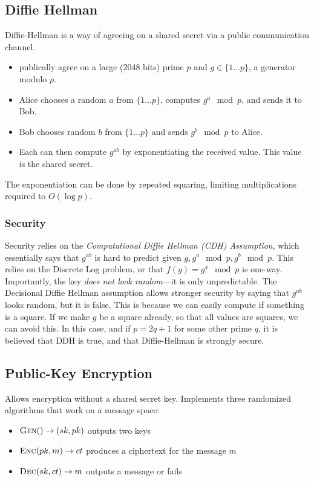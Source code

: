 \documentclass{article}
\begin{document}
\begin{multicols*}{2}
	\subsection{Diffie Hellman}
	Diffie-Hellman is a way of agreeing on a shared secret via a public communication channel.
	\begin{itemize}[noitemsep, topsep=0pt]
		\item publically agree on a large (2048 bits) prime $p$ and $g \in \{1\ldots p\}$, a generator modulo $p$.
		\item Alice chooses a random $a$ from $\{1\ldots p\}$, computes $g^a \mod p$, and sends it to Bob.
		\item Bob chooses random $b$ from $\{1\ldots p\}$ and sends $g^b \mod p$ to Alice.
		\item Each can then compute $g^{ab}$ by exponentiating the received value. This value is the shared secret.
	\end{itemize}

	The exponentiation can be done by repeated squaring, limiting multiplications required to $O(\log p)$. 

	\subsubsection{Security}
	Security relies on the \textit{Computational Diffie Hellman (CDH) Assumption}, which essentially says that $g^{ab}$ is hard to predict given $g, g^a \mod p, g^b \mod p$. This relies on the Discrete Log problem, or that $f(g) = g^x \mod p$ is one-way. Importantly, the key \textit{does not look random}---it is only unpredictable. The Decisional Diffie Hellman assumption allows stronger security by saying that $g^{ab}$ looks random, but it is false. This is because we can easily compute if something is a square. If we make $g$ be a square already, so that all values are squares, we can avoid this. In this case, and if $p=2q+1$ for some other prime $q$, it is believed that DDH is true, and that Diffie-Hellman is strongly secure. 

	\subsection{Public-Key Encryption}
	Allows encryption without a shared secret key. Implements three randomized algorithms that work on a message space:
	\begin{itemize}[noitemsep, topsep=0pt]
		\item $\textsc{Gen}() \rightarrow (sk, pk)$ outputs two keys
		\item $\textsc{Enc}(pk, m) \rightarrow ct$ produces a ciphertext for the message $m$
		\item $\textsc{Dec}(sk, ct) \rightarrow m$ outputs a message or fails
	\end{itemize}


\end{multicols*}
\end{document}
